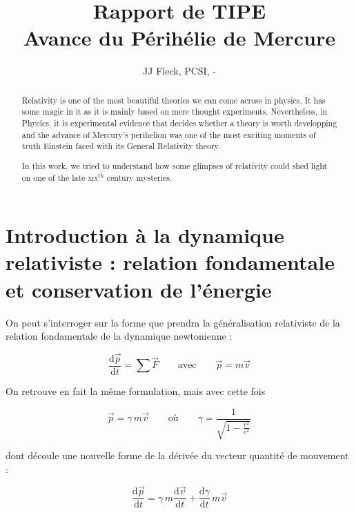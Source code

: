 \documentclass[12pt,a4paper]{article}
\title{Rapport de TIPE \\
Avance du Périhélie de Mercure}
\author{JJ Fleck, PCSI\oldstylenums{1}, \oldstylenums{2015}-\oldstylenums{2016}}
\newcommand{\ofg}[1]{\og{}#1\fg{}}
\newcommand{\dd}{\text{d}}
\newcommand{\ddt}[1]{\frac{\dd #1}{\dd t}}
\begin{document}
\maketitle

\begin{abstract}
    
    Relativity is one of the most beautiful theories we can come across in physics. It has some magic in it as it is mainly based on mere \ofg{thought experiments}. Nevertheless, in Phycics, it is experimental evidence that decides whether a theory is worth developping and the advance of Mercury's perihelion was one of the most exciting moments of truth Einstein faced with its \ofg{General Relativity} theory.
    
    In this work, we tried to understand how some glimpses of relativity could shed light on one of the late \textsc{xix}$^{\text{th}}$ century mysteries.
\end{abstract}

\section{Introduction à la dynamique relativiste : relation
fondamentale et conservation de l'énergie}

On peut s'interroger sur la forme que prendra la généralisation
relativiste de la relation fondamentale de la dynamique newtonienne :

\begin{equation}
    \ddt{\vec{p}} = \sum \vec{F} 
    \qquad \text{avec} \qquad 
    \vec{p} = m\vec{v}
\end{equation}

    On retrouve en fait la même formulation, mais avec cette fois

\begin{equation}
    \vec{p} = \gamma \, m \vec{v} 
    \qquad\text{où}\qquad
    \gamma=\frac{1}{\sqrt{1 - \frac{v^2}{c^2}}}
\end{equation}

\noindent dont découle une nouvelle forme de la dérivée du vecteur
quantité de mouvement :



\begin{equation}
    \ddt{\vec{p}} = 
    \gamma\, m \ddt{\vec{v}} + \ddt{\gamma}\, m \vec{v}
\end{equation}
\end{document}
